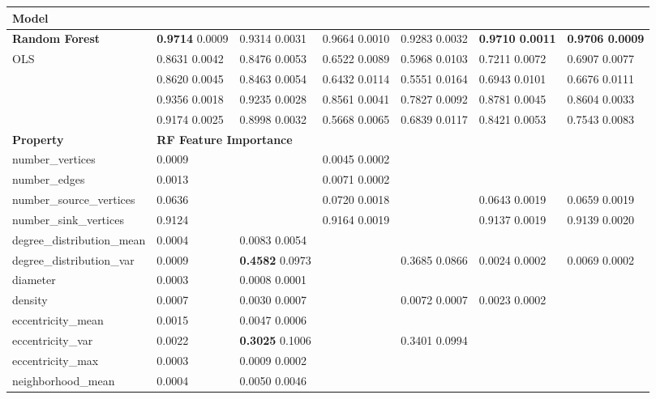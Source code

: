 \documentclass[runningheads]{llncs}
\begin{document}
\begin{landscape}
\begin{table}[htb]
	\centering

\begin{tabular}{|l|l|l|l|l|l|l|}
	\hline
	\textbf{Model} & \textbf{} & \textbf{} & \textbf{} & \textbf{} & \textbf{} & \textbf{} \\
	\hline
	\textbf{Random Forest } & \textbf{0.9714} 0.0009 & 0.9314 0.0031 & 0.9664 0.0010 & 0.9283 0.0032 & \textbf{0.9710 0.0011} & \textbf{0.9706 0.0009} \\
	OLS  & 0.8631 0.0042 & 0.8476 0.0053 & 0.6522 0.0089 & 0.5968 0.0103 & 0.7211 0.0072 & 0.6907 0.0077 \\
	   & 0.8620 0.0045 & 0.8463 0.0054 & 0.6432 0.0114 & 0.5551 0.0164 & 0.6943 0.0101 & 0.6676 0.0111 \\
	  & 0.9356 0.0018 & 0.9235 0.0028 & 0.8561 0.0041 & 0.7827 0.0092 & 0.8781 0.0045 & 0.8604 0.0033 \\
	   & 0.9174 0.0025 & 0.8998 0.0032 & 0.5668 0.0065 & 0.6839 0.0117 & 0.8421 0.0053 & 0.7543 0.0083 \\
	\hline
	\hline
	\textbf{Property} & \multicolumn{6}{l|}{\textbf{RF Feature Importance}} \\
	\hline
	number\_vertices & 0.0009 & ~ & 0.0045 0.0002 & ~ & ~ & ~ \\
	number\_edges & 0.0013 & ~ & 0.0071 0.0002 & ~ & ~ &  ~ \\
	number\_source\_vertices & 0.0636 & ~ & 0.0720 0.0018 & ~ & 0.0643 0.0019 & 0.0659 0.0019 \\
	number\_sink\_vertices & 0.9124 & ~ & 0.9164 0.0019 & ~ & 0.9137 0.0019 & 0.9139 0.0020 \\
	degree\_distribution\_mean & 0.0004 & 0.0083 0.0054 & ~ & ~ & ~ & ~ \\
	degree\_distribution\_var & 0.0009 & \textbf{0.4582} 0.0973 & ~ & 0.3685 0.0866 & 0.0024 0.0002 & 0.0069 0.0002 \\
	diameter & 0.0003 & 0.0008 0.0001 & ~ & ~ & ~ & ~ \\
	density & 0.0007 & 0.0030 0.0007 & ~ & 0.0072 0.0007 & 0.0023 0.0002 & ~ \\
	eccentricity\_mean & 0.0015 & 0.0047 0.0006 & ~ & ~ & ~ & ~ \\
	eccentricity\_var & 0.0022 & \textbf{0.3025} 0.1006 & ~ & 0.3401 0.0994 & ~ & ~ \\
	eccentricity\_max & 0.0003 & 0.0009 0.0002 & ~ & ~ & ~ & ~ \\
	neighborhood\_mean & 0.0004 & 0.0050 0.0046 & ~ & ~ & ~ & ~ \\

\end{tabular}
\end{table}
\end{landscape}
\end{document}
